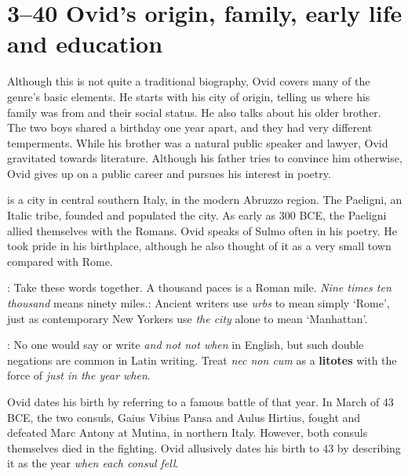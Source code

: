 \section*{3--40 Ovid's origin, family, early life and education}

Although this is not quite a traditional biography, Ovid covers many of the
genre's basic elements. He starts with his city of origin, telling us where his
family was from and their social status.  He also talks about his older
brother.  The two boys shared a birthday one year apart, and they had very
different temperments.  While his brother was a natural public speaker and
lawyer, Ovid gravitated towards literature.  Although his father tries to
convince him otherwise, Ovid gives up on a public career and pursues his
interest in poetry.


 is a city in central southern Italy, in the modern Abruzzo region.
The Paeligni, an Italic tribe, founded and populated the city.  As early as
300 BCE, the Paeligni allied themselves with the Romans.  Ovid speaks of Sulmo
often in his poetry.  He took pride in his birthplace, although he also thought
of it as a very small town compared with Rome.


: Take these words together.  A thousand
paces is a Roman mile.  \textit{Nine times ten thousand} means ninety
miles.\indent{}: Ancient writers use \textit{urbs} to mean simply
`Rome', just as contemporary New Yorkers use \textit{the city} alone to mean
`Manhattan'.


: No one would say or write \textit{and not not when} in
English, but such double negations are common in Latin writing.  Treat
\textit{nec non \lips cum} as a \textbf{litotes} with the force of \textit{just
in the year when}.


Ovid dates his birth by referring to a famous battle of that year.  In March of
43 BCE, the two consuls, Gaius Vibius Pansa and Aulus Hirtius, fought and
defeated Marc Antony at Mutina, in northern Italy.  However, both consuls
themselves died in the fighting.  Ovid allusively dates his birth to 43 by
describing it as the year \textit{when each consul fell}.


